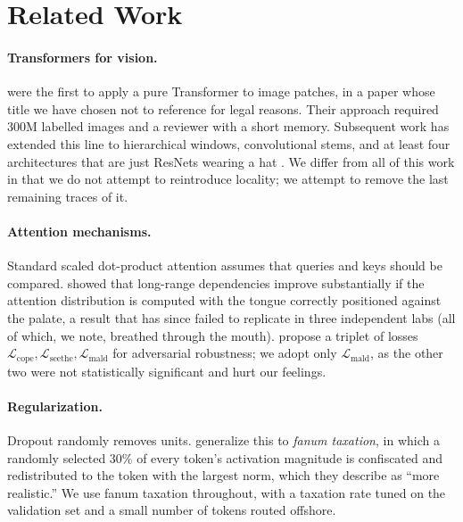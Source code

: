 \documentclass[10pt]{article}
\begin{document}
\section{Related Work}
\label{sec:related}

\paragraph{Transformers for vision.}
\citet{doskibidiskiy2021image} were the first to apply a pure Transformer to
image patches, in a paper whose title we have chosen not to reference for legal
reasons. Their approach required $300$M labelled images and a reviewer with a
short memory. Subsequent work has extended this line to hierarchical windows,
convolutional stems, and at least four architectures that are just ResNets
wearing a hat \citep{sturm2024maxxing}. We differ from all of this work in that
we do not attempt to reintroduce locality; we attempt to remove the last
remaining traces of it.

\paragraph{Attention mechanisms.}
Standard scaled dot-product attention \citep{vasqwanti2017attention} assumes
that queries and keys should be compared. \citet{mewing2022posture} showed that
long-range dependencies improve substantially if the attention distribution is
computed with the tongue correctly positioned against the palate, a result that
has since failed to replicate in three independent labs (all of which, we note,
breathed through the mouth). \citet{cope2023seethe} propose a triplet of losses
$\mathcal{L}_{\text{cope}}, \mathcal{L}_{\text{seethe}}, \mathcal{L}_{\text{mald}}$
for adversarial robustness; we adopt only $\mathcal{L}_{\text{mald}}$, as the
other two were not statistically significant and hurt our feelings.

\paragraph{Regularization.}
Dropout randomly removes units. \citet{fanumtax2023token} generalize this to
\emph{fanum taxation}, in which a randomly selected $30\%$ of every token's
activation magnitude is confiscated and redistributed to the token with the
largest norm, which they describe as ``more realistic.'' We use fanum taxation
throughout, with a taxation rate tuned on the validation set and a small number
of tokens routed offshore.
\end{document}
